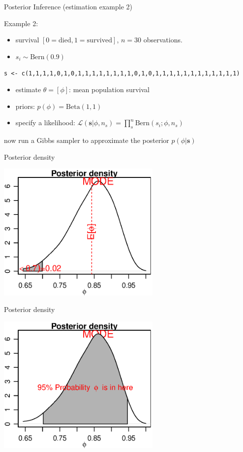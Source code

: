\documentclass[presentation,9pt,xcolor=dvipsnames]{beamer}
\begin{document}
\begin{frame}[fragile,label={sec:org14aeedc}]{Posterior Inference (estimation example 2)}
 \begin{block}{Example 2:}
\begin{itemize}
\item survival \([0=\text{died},1=\text{survived}]\), \(n=30\) observations.
\item \(s_i\sim\text{Bern}(0.9)\)
\end{itemize}
\texttt{s <- c(1,1,1,1,0,1,0,1,1,1,1,1,1,1,1,0,1,0,1,1,1,1,1,1,1,1,1,1,1,1)}
\begin{itemize}
\item estimate \(\theta=[\phi]\): mean population survival
\item priors:  \(p(\phi)=\text{Beta}(1,1)\)
\item specify a likelihood: \(\mathcal{L}(\mathbf{s}\vert\phi,n_s)=\prod_s^n\text{Bern}(s_i; \phi,n_s)\)
\end{itemize}
\alert{now run a Gibbs sampler to approximate the posterior} \(p(\phi\vert \mathbf{s})\)
\end{block}
\end{frame}
\begin{frame}[label={sec:org56cfbcc}]{Posterior density}
\begin{center}
\includegraphics[width=0.6\textwidth,height=0.6\textheight]{posterior_s3.eps}
\end{center}
\end{frame}
\begin{frame}[label={sec:org96fb61b}]{Posterior density}
\begin{center}
\includegraphics[width=0.6\textwidth,height=0.6\textheight]{posterior_s4.eps}
\end{center}
\end{frame}
\end{document}
